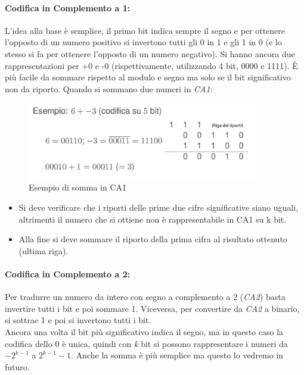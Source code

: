 \paragraph*{Codifica in Complemento a 1:} L’idea alla base è semplice, il primo bit indica sempre il segno e per ottenere l’opposto di un numero positivo si invertono tutti gli 0 in 1 e gli 1 in 0 (e lo stesso si fa per ottenere l’opposto di un numero negativo). Si hanno ancora due rappresentazioni per +0 e -0 (rispettivamente, utilizzando 4 bit, 0000 e 1111). È più facile da sommare rispetto al modulo e segno ma solo se il bit significativo non da riporto.
Quando si sommano due numeri in \textit{CA1}:
\begin{figure}[H]
	\centering
	\includegraphics[width=0.9\textwidth,keepaspectratio]{images/Somma-CA1.png}
	\caption{Esempio di somma in CA1}
\end{figure}
\begin{itemize}[noitemsep]
\item Si deve verificare che i riporti delle prime due cifre significative siano uguali, altrimenti il numero che si ottiene non è rappresentabile in CA1 su k bit.
\item Alla fine si deve sommare il riporto della prima cifra al risultato ottenuto (ultima riga).
\end{itemize}
\paragraph*{Codifica in Complemento a 2:} Per tradurre un numero da intero con segno a complemento a 2 (\textit{CA2}) basta invertire tutti i bit e poi sommare 1. Viceversa, per convertire da \textit{CA2} a binario, si sottrae 1 e poi si invertono tutti i bit. \\
Ancora una volta il bit più significativo indica il segno, ma in questo caso la codifica dello 0 è unica, quindi con \textit{k} bit si possono rappresentare i numeri da $-2^{k-1}$ a $2^{k-1}-1$. Anche la somma è più semplice ma questo lo vedremo in futuro.
